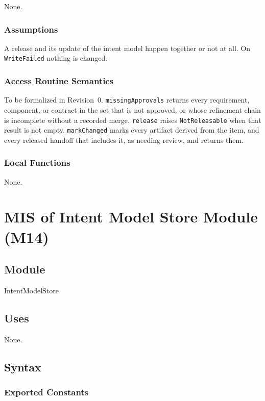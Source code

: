 \documentclass[12pt, titlepage]{article}
\begin{document}
None.

\subsubsection{Assumptions}

A release and its update of the intent model happen together or not at all.
On \texttt{WriteFailed} nothing is changed.

\subsubsection{Access Routine Semantics}

To be formalized in Revision~0. \texttt{missingApprovals} returns every
requirement, component, or contract in the set that is not approved, or whose
refinement chain is incomplete without a recorded merge. \texttt{release} raises
\texttt{NotReleasable} when that result is not empty. \texttt{markChanged} marks
every artifact derived from the item, and every released handoff that includes
it, as needing review, and returns them.

\subsubsection{Local Functions}

None.

\newpage
\section{MIS of Intent Model Store Module (M14)} \label{MISStore}

\subsection{Module}

IntentModelStore

\subsection{Uses}

None.

\subsection{Syntax}

\subsubsection{Exported Constants}
\end{document}

